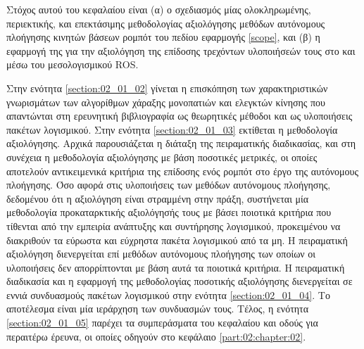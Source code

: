 Στόχος αυτού του κεφαλαίου είναι (α) ο σχεδιασμός μίας ολοκληρωμένης,
περιεκτικής, και επεκτάσιμης μεθοδολογίας αξιολόγησης μεθόδων αυτόνομους
πλοήγησης κινητών βάσεων ρομπότ του πεδίου εφαρμογής \ref{scope}, και (β) η
εφαρμογή της για την αξιολόγηση της επίδοσης τρεχόντων υλοποιήσεών τους στο και
μέσω του μεσολογισμικού ROS.

Στην ενότητα \ref{section:02_01_02} γίνεται η επισκόπηση των χαρακτηριστικών
γνωρισμάτων των αλγορίθμων χάραξης μονοπατιών και ελεγκτών κίνησης που
απαντώνται στη ερευνητική βιβλιογραφία ως θεωρητικές μέθοδοι και ως υλοποιήσεις
πακέτων λογισμικού. Στην ενότητα \ref{section:02_01_03} εκτίθεται η μεθοδολογία
αξιολόγησης. Αρχικά παρουσιάζεται η διάταξη της πειραματικής διαδικασίας, και
στη συνέχεια η μεθοδολογία αξιολόγησης με βάση ποσοτικές μετρικές, οι οποίες
αποτελούν αντικειμενικά κριτήρια της επίδοσης ενός ρομπότ στο έργο της
αυτόνομους πλοήγησης. Όσο αφορά στις υλοποιήσεις των μεθόδων αυτόνομους
πλοήγησης, δεδομένου ότι η αξιολόγηση είναι στραμμένη στην πράξη, συστήνεται
μία μεθοδολογία προκαταρκτικής αξιολόγησής τους με βάσει ποιοτικά κριτήρια που
τίθενται από την εμπειρία ανάπτυξης και συντήρησης λογισμικού, προκειμένου να
διακριθούν τα εύρωστα και εύχρηστα πακέτα λογισμικού από τα μη.  Η πειραματική
αξιολόγηση διενεργείται επί μεθόδων αυτόνομους πλοήγησης των οποίων οι
υλοποιήσεις δεν απορρίπτονται με βάση αυτά τα ποιοτικά κριτήρια. Η πειραματική
διαδικασία και η εφαρμογή της μεθοδολογίας ποσοτικής αξιολόγησης διενεργείται
σε εννιά συνδυασμούς πακέτων λογισμικού στην ενότητα \ref{section:02_01_04}. Το
αποτέλεσμα είναι μία ιεράρχηση των συνδυασμών τους.  Τέλος, η ενότητα
\ref{section:02_01_05} παρέχει τα συμπεράσματα του κεφαλαίου και οδούς για
περαιτέρω έρευνα, οι οποίες οδηγούν στο κεφάλαιο \ref{part:02:chapter:02}.
